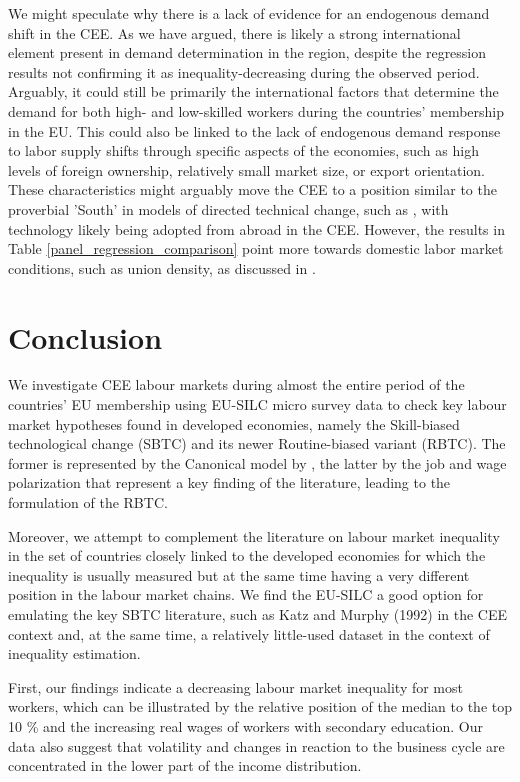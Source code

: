 \documentclass[11pt]{article}
\begin{document}
We might speculate why there is a lack of evidence for an endogenous demand shift in the CEE. As we have argued, there is likely a strong international element present in demand determination in the region, despite the regression results not confirming it as inequality-decreasing during the observed period. Arguably, it could still be primarily the international factors that determine the demand for both high- and low-skilled workers during the countries' membership in the EU. This could also be linked to the lack of endogenous demand response to labor supply shifts through specific aspects of the economies, such as high levels of foreign ownership, relatively small market size, or export orientation. These characteristics might arguably move the CEE to a position similar to the proverbial 'South' in models of directed technical change, such as \cite{acemoglu2002directed}, with technology likely being adopted from abroad in the CEE. However, the results in Table \ref{panel_regression_comparison} point more towards domestic labor market conditions, such as union density, as discussed in \cite{farber2021unions}.

\section{Conclusion}
We investigate CEE labour markets during almost the entire period of the countries' EU membership using EU-SILC micro survey data to check key labour market hypotheses found in developed economies, namely the Skill-biased technological change (SBTC) and its newer Routine-biased variant (RBTC). The former is represented by the Canonical model by \citet{katz1992changes}, the latter by the job and wage polarization that represent a key finding of the literature, leading to the formulation of the RBTC.

Moreover, we attempt to complement the literature on labour market inequality in the set of countries closely linked to the developed economies for which the inequality is usually measured but at the same time having a very different position in the labour market chains. We find the EU-SILC a good option for emulating the key SBTC literature, such as Katz and Murphy (1992) in the CEE context and, at the same time, a relatively little-used dataset in the context of inequality estimation.

First, our findings indicate a decreasing labour market inequality for most workers, which can be illustrated by the relative position of the median to the top 10 \% and the increasing real wages of workers with secondary education. Our data also suggest that volatility and changes in reaction to the business cycle are concentrated in the lower part of the income distribution.
\end{document}
